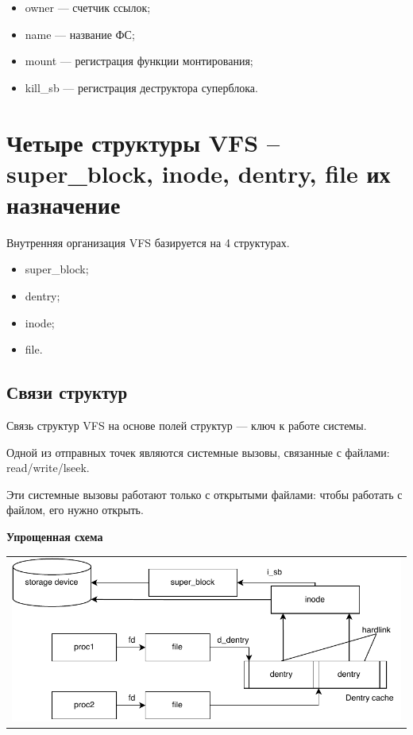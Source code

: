 \begin{itemize}
	\item owner --- счетчик ссылок;
	\item name --- название ФС;
	\item mount --- регистрация функции монтирования;
	\item kill\_sb --- регистрация деструктора суперблока.
\end{itemize}

\section{Четыре структуры VFS – super\_block, inode, dentry, file их назначение}

Внутренняя организация VFS базируется на 4 структурах.

\begin{itemize}
    \item super\_block;
    \item dentry;
    \item inode;
    \item file.
\end{itemize}

\subsection{Связи структур}
Связь структур VFS на основе полей структур --- ключ к работе системы.

Одной из отправных точек являются системные вызовы, связанные с файлами: read/write/lseek. 

Эти системные вызовы работают только с открытыми файлами: чтобы работать с файлом, его нужно открыть.

\textbf{Упрощенная схема}
\begin{table}[h!]
  \centering
  \begin{tabular}{p{1\linewidth}}
    \centering
    \includegraphics[width=0.8\linewidth]{./images/struct_connect.pdf}
  \end{tabular}
\end{table}


